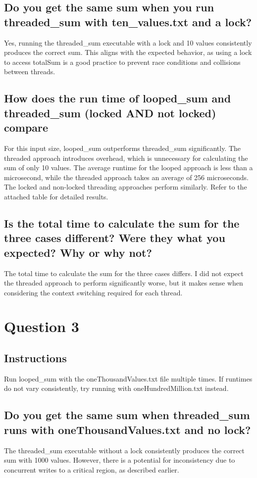 \documentclass{assignment-x}
\begin{document}
\subsection{Do you get the same sum when you run threaded\_sum with ten\_values.txt and a lock?}
Yes, running the threaded\_sum executable with a lock and 10 values consistently produces the correct sum. This aligns with the expected behavior, as using a lock to access totalSum is a good practice to prevent race conditions and collisions between threads.

\subsection{How does the run time of looped\_sum and threaded\_sum (locked AND not locked) compare}
For this input size, looped\_sum outperforms threaded\_sum significantly. The threaded approach introduces overhead, which is unnecessary for calculating the sum of only 10 values. The average runtime for the looped approach is less than a microsecond, while the threaded approach takes an average of 256 microseconds. The locked and non-locked threading approaches perform similarly. Refer to the attached table for detailed results.

\subsection{Is the total time to calculate the sum for the three cases different? Were they what you expected? Why or why not?}
The total time to calculate the sum for the three cases differs. I did not expect the threaded approach to perform significantly worse, but it makes sense when considering the context switching required for each thread.

\section{Question 3}
\subsection{Instructions}
Run looped\_sum with the oneThousandValues.txt file multiple times. If runtimes do not vary consistently, try running with oneHundredMillion.txt instead.

\subsection{Do you get the same sum when threaded\_sum runs with oneThousandValues.txt and no lock?}
The threaded\_sum executable without a lock consistently produces the correct sum with 1000 values. However, there is a potential for inconsistency due to concurrent writes to a critical region, as described earlier.
\end{document}
